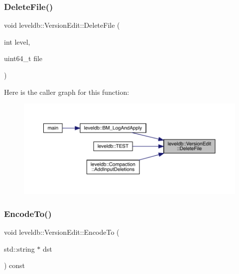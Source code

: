 \subsubsection{\texorpdfstring{DeleteFile()}{DeleteFile()}}
{\footnotesize\ttfamily void leveldb\+::\+Version\+Edit\+::\+Delete\+File (\begin{DoxyParamCaption}\item[{int}]{level,  }\item[{uint64\+\_\+t}]{file }\end{DoxyParamCaption})\hspace{0.3cm}{\ttfamily [inline]}}

Here is the caller graph for this function\+:
\nopagebreak
\begin{figure}[H]
\begin{center}
\leavevmode
\includegraphics[width=350pt]{classleveldb_1_1_version_edit_ac222bfd1055114d57aadbd124f24ad0c_icgraph}
\end{center}
\end{figure}
\mbox{\label{classleveldb_1_1_version_edit_af95009ddc020f72a32a1aa805bcf3a91}} 
\subsubsection{\texorpdfstring{EncodeTo()}{EncodeTo()}}
{\footnotesize\ttfamily void leveldb\+::\+Version\+Edit\+::\+Encode\+To (\begin{DoxyParamCaption}\item[{std\+::string $\ast$}]{dst }\end{DoxyParamCaption}) const}

